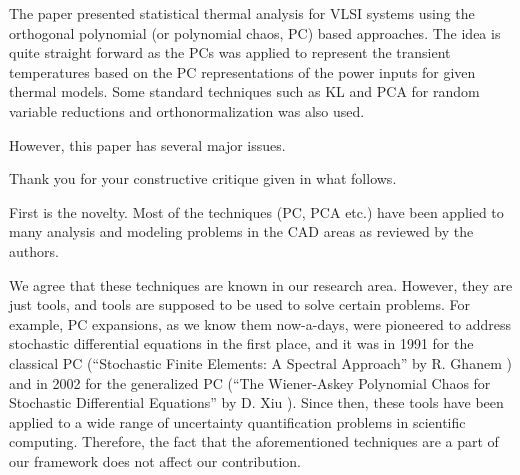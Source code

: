 \begin{reviewer}
The paper presented statistical thermal analysis for VLSI systems using the orthogonal polynomial  (or polynomial chaos, PC) based approaches. The idea is quite straight forward as the PCs was applied to represent the transient temperatures based on the PC representations of the power inputs for given thermal models. Some standard techniques such as KL and PCA for random variable reductions and orthonormalization was also used.

However, this paper has several major issues.
\end{reviewer}
\begin{authors}
Thank you for your constructive critique given in what follows.
\end{authors}

\begin{reviewer}
First is the novelty. Most of the techniques (PC, PCA etc.) have been applied to many analysis and modeling problems in the CAD areas as reviewed by the authors.
\end{reviewer}
\begin{authors}
We agree that these techniques are known in our research area.
However, they are just tools, and tools are supposed to be used to solve certain problems.
For example, PC expansions, as we know them now-a-days, were pioneered to address stochastic differential equations in the first place, and it was in 1991 for the classical PC (``Stochastic Finite Elements: A Spectral Approach'' by R. Ghanem \etal) and in 2002 for the generalized PC (``The Wiener-Askey Polynomial Chaos for Stochastic Differential Equations'' by D. Xiu \etal).
Since then, these tools have been applied to a wide range of uncertainty quantification problems in scientific computing.
Therefore, the fact that the aforementioned techniques are a part of our framework does not affect our contribution.
\end{authors}

